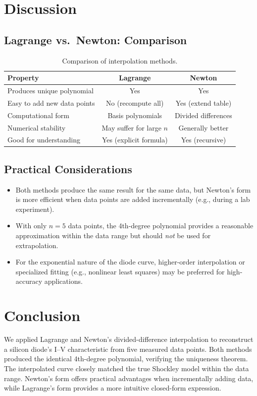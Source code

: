 \documentclass[letterpaper,twocolumn,fleqn]{article}
\begin{document}
\section{Discussion}

\subsection{Lagrange vs.\ Newton: Comparison}
\begin{table}[H]
\centering
\small
\begin{tabular}{@{}lcc@{}}
\toprule
\textbf{Property} & \textbf{Lagrange} & \textbf{Newton} \\
\midrule
Produces unique polynomial & Yes & Yes \\
Easy to add new data points & No (recompute all) & Yes (extend table) \\
Computational form & Basis polynomials & Divided differences \\
Numerical stability & May suffer for large $n$ & Generally better \\
Good for understanding & Yes (explicit formula) & Yes (recursive) \\
\bottomrule
\end{tabular}
\caption{Comparison of interpolation methods.}
\label{tab:comparison}
\end{table}

\subsection{Practical Considerations}
\begin{itemize}
  \item Both methods produce the same result for the same data, but Newton's
        form is more efficient when data points are added incrementally (e.g.,
        during a lab experiment).
  \item With only $n=5$ data points, the 4th-degree polynomial provides a
        reasonable approximation within the data range but should \emph{not}
        be used for extrapolation.
  \item For the exponential nature of the diode curve, higher-order
        interpolation or specialized fitting (e.g., nonlinear least squares)
        may be preferred for high-accuracy applications.
\end{itemize}

\section{Conclusion}

We applied Lagrange and Newton's divided-difference interpolation to
reconstruct a silicon diode's I--V characteristic from five measured data
points.  Both methods produced the identical 4th-degree polynomial, verifying
the uniqueness theorem.  The interpolated curve closely matched the true
Shockley model within the data range.  Newton's form offers practical
advantages when incrementally adding data, while Lagrange's form provides a
more intuitive closed-form expression.
\end{document}
